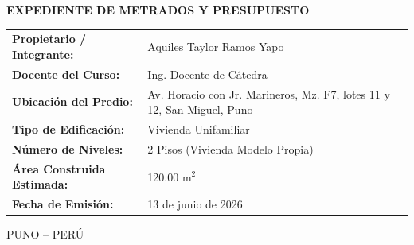 \begin{titlepage}
\begin{minipage}{5.20in}
\vspace{0.40in}
{\fontsize{13}{16}\selectfont\bfseries EXPEDIENTE DE METRADOS Y PRESUPUESTO\par}

\vspace{0.40in}
\begin{flushleft}
\fontsize{10}{13}\selectfont
\renewcommand{\arraystretch}{1.2}
\begin{tabular}{>{\bfseries}p{1.8in}p{3.05in}}
Propietario / Integrante: & Aquiles Taylor Ramos Yapo \\
Docente del Curso: & Ing. Docente de Cátedra \\
Ubicación del Predio: & Av. Horacio con Jr. Marineros, Mz. F7, lotes 11 y 12, San Miguel, Puno \\
Tipo de Edificación: & Vivienda Unifamiliar \\
Número de Niveles: & 2 Pisos (Vivienda Modelo Propia) \\
Área Construida Estimada: & 120.00 m\(^2\) \\
Fecha de Emisión: & 13 de junio de 2026 \\
\end{tabular}
\end{flushleft}

\vfill
{\fontsize{10}{12}\selectfont PUNO -- PERÚ\par}
{\fontsize{9}{11}\par}
\end{minipage}

\end{titlepage}
